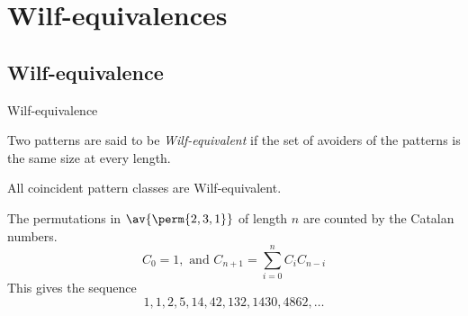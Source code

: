 \section{Wilf-equivalences}
\label{sec:Wilf-equivalences}
\subsection{Wilf-equivalence}
\label{sub:Wilf-equivalence}
\begin{frame}{Wilf-equivalence}
  \begin{definition}
  Two patterns are said to be \emph{Wilf-equivalent} if the set of avoiders
  of the patterns is the same size at every length.
\end{definition}
 All coincident pattern classes are Wilf-equivalent.

 The permutations in \(\av{\perm{2,3,1}}\) of length \(n\) are counted by the
 Catalan numbers.
 \begin{equation}
   C_0 = 1, \text{ and } C_{n+1} =\sum_{i=0}^{n}C_iC_{n-i}
 \end{equation}
 This gives the sequence
 \begin{equation*}
   1,1,2,5,14,42,132,1430,4862,\dotsc
 \end{equation*}
\end{frame}
